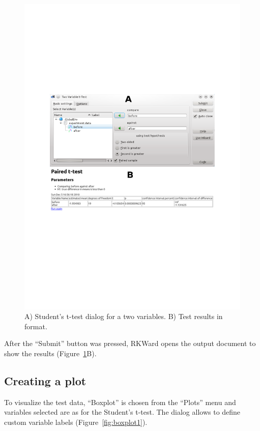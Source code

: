 \begin{figure}[htp]
 \centering
 \includegraphics[clip=true,trim=0cm 5.7cm 0cm 5.7cm,width=16cm]{../figures/t-test.pdf}
 \caption{A) Student's t-test dialog for a two variables. B) Test results in  format.}
 \label{fig:t_test}
\end{figure}

After the ``Submit'' button was pressed, RKWard opens the output document
to show the results (Figure~\ref{fig:t_test}B).

\subsection{Creating a plot}
\label{sec:create_plot}
To visualize the test data, ``Boxplot'' is chosen from the ``Plots'' menu
and variables selected are as for the Student's t-test.
The dialog allows to define custom variable labels (Figure~\ref{fig:boxplot1}).

